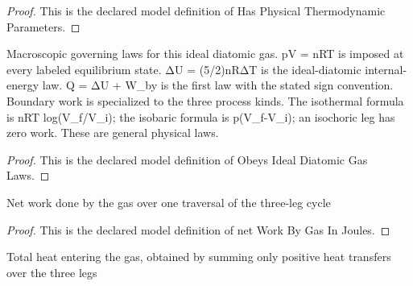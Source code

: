 \begin{proof}
  This is the declared model definition of Has Physical Thermodynamic Parameters.
\end{proof}
\begin{definition}
  \label{def:physics:phyx-mini-0350:phyxminiproblems-problemphyxmini0350-obeysidealdiatomicgaslaws}
  Macroscopic governing laws for this ideal diatomic gas. pV = nRT is imposed at every labeled equilibrium state. ΔU = (5/2)nRΔT is the ideal-diatomic internal-energy law. Q = ΔU + W\_by is the first law with the stated sign convention. Boundary work is specialized to the three process kinds. The isothermal formula is nRT log(V\_f/V\_i); the isobaric formula is p(V\_f-V\_i); an isochoric leg has zero work. These are general physical laws.
\end{definition}
\begin{proof}
  This is the declared model definition of Obeys Ideal Diatomic Gas Laws.
\end{proof}
\begin{definition}
  \label{def:physics:phyx-mini-0350:phyxminiproblems-problemphyxmini0350-networkbygasinjoules}
  Net work done by the gas over one traversal of the three-leg cycle
\end{definition}
\begin{proof}
  This is the declared model definition of net Work By Gas In Joules.
\end{proof}
\begin{definition}
  \label{def:physics:phyx-mini-0350:phyxminiproblems-problemphyxmini0350-totalheatinputinjoules}
  Total heat entering the gas, obtained by summing only positive heat transfers over the three legs
\end{definition}
